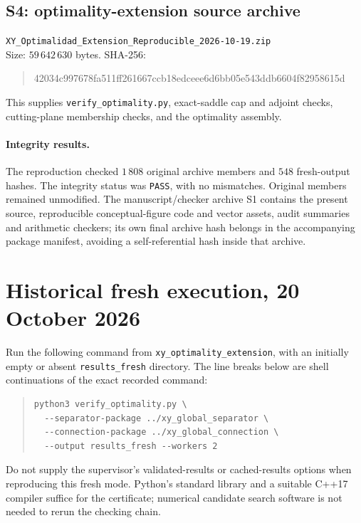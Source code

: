 \documentclass[10pt]{article}
\newcommand{\code}[1]{\nolinkurl{#1}}
\begin{document}
\subsection*{S4: optimality-extension source archive}
\noindent\code{XY_Optimalidad_Extension_Reproducible_2026-10-19.zip}\\
Size: $59\,642\,630$ bytes. SHA-256:
\begin{quote}\small\ttfamily
42034c997678fa511ff261667ccb18edceee6d6bb05e543ddb6604f82958615d
\end{quote}
This supplies \code{verify_optimality.py}, exact-saddle cap and adjoint
checks, cutting-plane membership checks, and the optimality assembly.

\paragraph{Integrity results.}
The reproduction checked $1\,808$ original archive members and $548$
fresh-output hashes. The integrity status was \code{PASS}, with no
mismatches. Original members remained unmodified. The manuscript/checker
archive S1 contains the present source, reproducible conceptual-figure
code and vector assets, audit summaries and arithmetic checkers; its own final archive hash belongs in the accompanying package
manifest, avoiding a self-referential hash inside that archive.

\clearpage
\section{Historical fresh execution, 20 October 2026}

Run the following command from \code{xy_optimality_extension}, with an
initially empty or absent \code{results_fresh} directory. The line breaks
below are shell continuations of the exact recorded command:
\begin{quote}\small
\begin{verbatim}
python3 verify_optimality.py \
  --separator-package ../xy_global_separator \
  --connection-package ../xy_global_connection \
  --output results_fresh --workers 2
\end{verbatim}
\end{quote}
Do not supply the supervisor's validated-results or cached-results
options when reproducing this fresh mode. Python's standard library and
a suitable C++17 compiler suffice for the certificate; numerical candidate
search software is not needed to rerun the checking chain.
\end{document}
